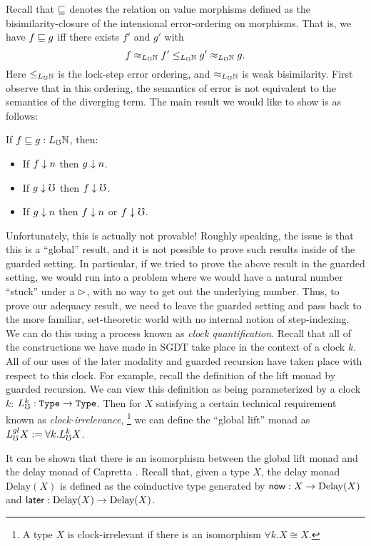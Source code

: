 Recall that $\sqsubseteq$ denotes the relation on value morphisms defined as the bisimilarity-closure
of the intensional error-ordering on morphisms.
That is, we have $f \sqsubseteq g$ iff there exists $f'$ and $g'$ with
%
\[ f \approx_{L_\mho \mathbb{N}} f' \le_{L_\mho \mathbb{N}} g' \approx_{L_\mho \mathbb{N}} g. \]
%
Here $\le_{L_\mho \mathbb{N}}$ is the lock-step error ordering, and
$\approx_{L_\mho \mathbb{N}}$ is weak bisimilarity.
First observe that in this ordering, the semantics of error is not equivalent to
the semantics of the diverging term.
The main result we would like to show is as follows:
\begin{lemma}
If $f \sqsubseteq g : L_\mho \mathbb{N}$, then:
\begin{itemize}
  \item If $f \downarrow n$ then $g \downarrow n$.
  \item If $g \downarrow \mho$ then $f \downarrow \mho$.
  \item If $g \downarrow n$ then $f \downarrow n$ or $f \downarrow \mho$.
\end{itemize}
\end{lemma}
%
Unfortunately, this is actually not provable!
Roughly speaking, the issue is that this is a ``global'' result, and it is not possible
to prove such results inside of the guarded setting. 
In particular, if we tried to prove the above result in the guarded
setting, we would run into a problem where we would have a natural number
``stuck'' under a $\vartriangleright$, with no way to get out the underlying number.
%
Thus, to prove our adequacy result, we need to leave the guarded setting and pass back
to the more familiar, set-theoretic world with no internal notion of step-indexing.
We can do this using a process known as \emph{clock quantification}.
Recall that all of the constructions we have made in SGDT take place in the context of a clock $k$.
All of our uses of the later modality and guarded recursion have taken place with respect to this clock.
For example, recall the definition of the lift monad by guarded recursion.
We can view this definition as being parameterized by a clock $k$: $L_\mho^k : \texttt{Type} \to \texttt{Type}$.
Then for $X$ satisfying a certain technical requirement known as \emph{clock-irrelevance},
\footnote{A type $X$ is clock-irrelevant if there is an isomorphism $\forall k.X \cong X$.}
we can define the ``global lift'' monad as $L_\mho^{gl} X := \forall k. L_\mho^k X$.

It can be shown that there is an isomorphism between the global lift monad and the
delay monad of Capretta \cite{lmcs:2265}.
Recall that, given a type $X$, the delay monad $\text{Delay}(X)$ is defined as the coinductive
type generated by 
$\mathsf{now} : X \to \text{Delay}(X)$ and $\mathsf{later} : \text{Delay}(X) \to \text{Delay}(X)$.

